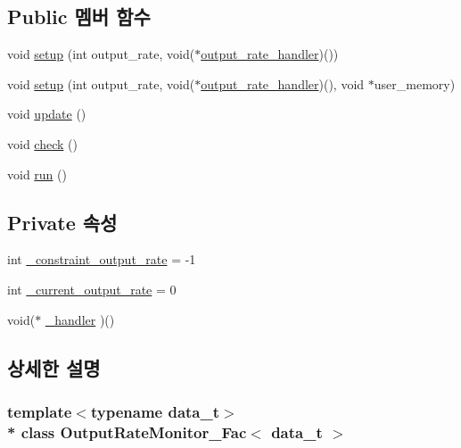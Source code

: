 \subsection*{Public 멤버 함수}
\begin{DoxyCompactItemize}
\item 
void \hyperlink{classOutputRateMonitor__Fac_aa99544a53559660f7445e6e4c590d016}{setup} (int output\+\_\+rate, void($\ast$\hyperlink{sample__main_8cpp_a0167d75fe4305d84db6ab81870dbcefb}{output\+\_\+rate\+\_\+handler})())
\item 
void \hyperlink{classOutputRateMonitor__Fac_a1118ffc5a63ab0c532f262f10fdf2f34}{setup} (int output\+\_\+rate, void($\ast$\hyperlink{sample__main_8cpp_a0167d75fe4305d84db6ab81870dbcefb}{output\+\_\+rate\+\_\+handler})(), void $\ast$user\+\_\+memory)
\item 
void \hyperlink{classOutputRateMonitor__Fac_a9d9c9bf96358e3bed4830fff64a43d55}{update} ()
\item 
void \hyperlink{classOutputRateMonitor__Fac_a8095eb4fc1a97052860845f61a5e94cf}{check} ()
\item 
void \hyperlink{classOutputRateMonitor__Fac_a68291057651910ae5ba624a02586b2a2}{run} ()
\end{DoxyCompactItemize}
\subsection*{Private 속성}
\begin{DoxyCompactItemize}
\item 
int \hyperlink{classOutputRateMonitor__Fac_a643652d21673c7b419b951b3bc9f5a55}{\+\_\+constraint\+\_\+output\+\_\+rate} = -\/1
\item 
int \hyperlink{classOutputRateMonitor__Fac_ac253ef05f07112046e63e4ba4fbbd62d}{\+\_\+current\+\_\+output\+\_\+rate} = 0
\item 
void($\ast$ \hyperlink{classOutputRateMonitor__Fac_a3bd9aaba10808157723d683f54141685}{\+\_\+handler} )()
\end{DoxyCompactItemize}


\subsection{상세한 설명}
\subsubsection*{template$<$typename data\+\_\+t$>$\\*
class Output\+Rate\+Monitor\+\_\+\+Fac$<$ data\+\_\+t $>$}



